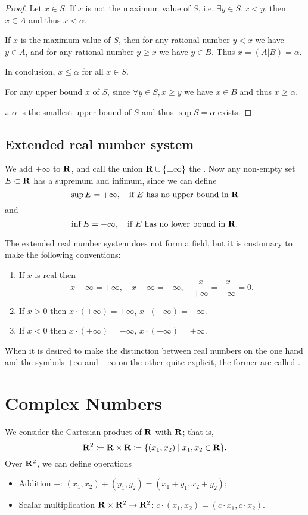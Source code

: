 \begin{proof}
Let $x \in S$. 
If $x$ is not the maximum value of $S$, i.e. $\exists y \in S,x<y$, then $x \in A$ and thus $x<\alpha$.

If $x$ is the maximum value of $S$, then for any rational number $y<x$ we have $y \in A$, and for any rational number $y \ge x$ we have $y \in B$.
Thus $x=(A|B)=\alpha$.

In conclusion, $x \le \alpha$ for all $x \in S$.

For any upper bound $x$ of $S$, since $\forall y \in S, x \ge y$ we have $x \in B$ and thus $x \ge \alpha$.

$\therefore$ $\alpha$ is the smallest upper bound of $S$ and thus $\sup S = \alpha$ exists.
\end{proof}

\subsection{Extended real number system}
\begin{definition}
We add $\pm\infty$ to $\mathbf R$, and call the union $\mathbf R\cup\{\pm\infty\}$ the . Now any non-empty set $E\subset\mathbf R$ has a supremum and infimum, since we can define
\[\sup E=+\infty,\quad\text{if $E$ has no upper bound in $\mathbf R$}\]
and
\[\inf E=-\infty,\quad\text{if $E$ has no lower bound in $\mathbf R$.}\]
\end{definition}

The extended real number system does not form a field, but it is customary to make the following conventions:
\begin{enumerate}[label=(\arabic*)]
\item If $x$ is real then
\[ x+\infty=+\infty, \quad x-\infty=-\infty, \quad \frac{x}{+\infty}=\frac{x}{-\infty}=0. \]
\item If $x>0$ then $x\cdot(+\infty)=+\infty$, $x\cdot(-\infty)=-\infty$.
\item If $x<0$ then $x\cdot(+\infty)=-\infty$, $x\cdot(-\infty)=+\infty$.
\end{enumerate}
When it is desired to make the distinction between real numbers on the one hand and the symbols $+\infty$ and $-\infty$ on the other quite explicit, the former are called .
\pagebreak

\section{Complex Numbers}
We consider the Cartesian product of $\mathbf R$ with $\mathbf R$; that is,
\[ \mathbf R^2\coloneqq\mathbf R\times\mathbf R\coloneqq\{(x_1,x_2)\mid x_1,x_2\in\mathbf R\}. \]
Over $\mathbf R^2$, we can define operations
\begin{itemize}
\item Addition $+$: $(x_1,x_2)+(y_1,y_2)=(x_1+y_1,x_2+y_2)$;
\item Scalar multiplication $\mathbf R\times\mathbf R^2\to\mathbf R^2$: $c\cdot(x_1,x_2)=(c\cdot x_1,c\cdot x_2)$.
\end{itemize}

